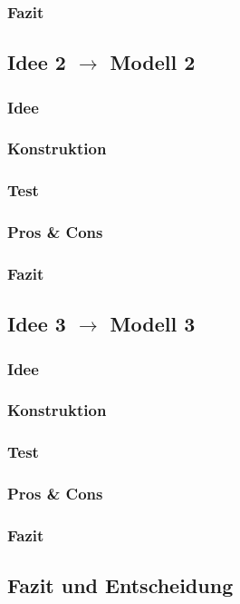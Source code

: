 \documentclass[10pt,a4paper]{scrartcl}
\begin{document}
\subsubsection{Fazit}
\subsection{Idee 2 $\rightarrow$ Modell 2}%
\subsubsection{Idee}
\subsubsection{Konstruktion}
\subsubsection{Test}
\subsubsection{Pros \& Cons}
\subsubsection{Fazit}
\subsection{Idee 3 $\rightarrow$ Modell 3}%
\subsubsection{Idee}
\subsubsection{Konstruktion}
\subsubsection{Test}
\subsubsection{Pros \& Cons}
\subsubsection{Fazit}
\subsection{Fazit und Entscheidung}
\end{document}

